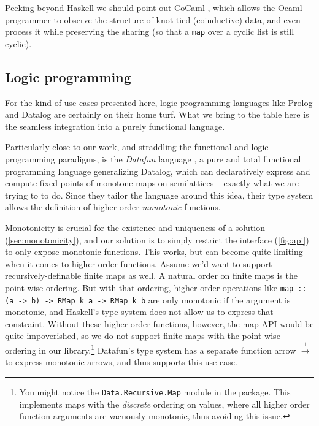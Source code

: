 \documentclass[manuscript,screen,acmsmall]{acmart}
\begin{document}
Peeking beyond Haskell we should point out CoCaml \citep{cocaml}, which allows the Ocaml programmer to observe the structure of knot-tied (coinductive) data, and even process it while preserving the sharing (so that a \verb|map| over a cyclic list is still cyclic).


\subsection{Logic programming}

For the kind of use-cases presented here, logic programming languages like Prolog and Datalog are certainly on their home turf. What we bring to the table here is the seamless integration into a purely functional language.

Particularly close to our work, and straddling the functional and logic programming paradigms, is the \emph{Datafun} language \citep{datafun}, a pure and total functional programming language generalizing Datalog, which can declaratively express and compute fixed points of monotone maps on semilattices -- exactly what we are trying to to do. Since they tailor the language around this idea, their type system allows the definition of higher-order \emph{monotonic} functions.

Monotonicity is crucial for the existence and uniqueness of a solution (\cref{sec:monotonicity}), and our solution is to simply restrict the interface (\cref{fig:api}) to only expose monotonic functions. This works, but can become quite limiting when it comes to higher-order functions. Assume we'd want to support recursively-definable finite maps as well. A natural order on finite maps is the point-wise ordering. But with that ordering, higher-order operations like \verb|map :: (a -> b) -> RMap k a -> RMap k b| are only monotonic if the argument is monotonic, and Haskell's type system does not allow us to express that constraint. Without these higher-order functions, however, the map API would be quite impoverished, so we do not support finite maps with the point-wise ordering in our library.\footnote{You might notice the \texttt{Data.Recursive.Map} module in the package. This implements maps with the \emph{discrete} ordering on values, where all higher order function arguments are vacuously monotonic, thus avoiding this issue.} Datafun's type system has a separate function arrow $\xrightarrow{+}$ to express monotonic arrows, and thus supports this use-case.




\end{document}
